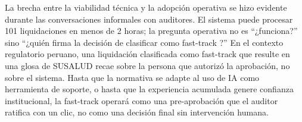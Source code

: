 La brecha entre la viabilidad técnica y la adopción operativa se hizo evidente durante las conversaciones informales con auditores. El sistema puede procesar 101 liquidaciones en menos de 2 horas; la pregunta operativa no es “¿funciona?” sino “¿quién firma la decisión de clasificar como fast-track ?” En el contexto regulatorio peruano, una liquidación clasificada como fast-track que resulte en una glosa de SUSALUD recae sobre la persona que autorizó la aprobación, no sobre el sistema. Hasta que la normativa se adapte al uso de IA como herramienta de soporte, o hasta que la experiencia acumulada genere confianza institucional, la fast-track operará como una pre-aprobación que el auditor ratifica con un clic, no como una decisión final sin intervención humana.

